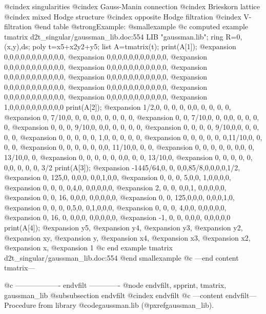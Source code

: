 @cindex singularities
@cindex Gauss-Manin connection
@cindex Brieskorn lattice
@cindex mixed Hodge structure
@cindex opposite Hodge filtration
@cindex V-filtration
@end table
@strong{Example:}
@smallexample
@c computed example tmatrix d2t_singular/gaussman_lib.doc:554 
LIB "gaussman.lib";
ring R=0,(x,y),ds;
poly t=x5+x2y2+y5;
list A=tmatrix(t);
print(A[1]);
@expansion{} 0,0,0,0,0,0,0,0,0,0,0,
@expansion{} 0,0,0,0,0,0,0,0,0,0,0,
@expansion{} 0,0,0,0,0,0,0,0,0,0,0,
@expansion{} 0,0,0,0,0,0,0,0,0,0,0,
@expansion{} 0,0,0,0,0,0,0,0,0,0,0,
@expansion{} 0,0,0,0,0,0,0,0,0,0,0,
@expansion{} 0,0,0,0,0,0,0,0,0,0,0,
@expansion{} 0,0,0,0,0,0,0,0,0,0,0,
@expansion{} 0,0,0,0,0,0,0,0,0,0,0,
@expansion{} 0,0,0,0,0,0,0,0,0,0,0,
@expansion{} 1,0,0,0,0,0,0,0,0,0,0 
print(A[2]);
@expansion{} 1/2,0,   0,   0,   0,   0,0,    0,    0,    0,    0, 
@expansion{} 0,  7/10,0,   0,   0,   0,0,    0,    0,    0,    0, 
@expansion{} 0,  0,   7/10,0,   0,   0,0,    0,    0,    0,    0, 
@expansion{} 0,  0,   0,   9/10,0,   0,0,    0,    0,    0,    0, 
@expansion{} 0,  0,   0,   0,   9/10,0,0,    0,    0,    0,    0, 
@expansion{} 0,  0,   0,   0,   0,   1,0,    0,    0,    0,    0, 
@expansion{} 0,  0,   0,   0,   0,   0,11/10,0,    0,    0,    0, 
@expansion{} 0,  0,   0,   0,   0,   0,0,    11/10,0,    0,    0, 
@expansion{} 0,  0,   0,   0,   0,   0,0,    0,    13/10,0,    0, 
@expansion{} 0,  0,   0,   0,   0,   0,0,    0,    0,    13/10,0, 
@expansion{} 0,  0,   0,   0,   0,   0,0,    0,    0,    0,    3/2
print(A[3]);
@expansion{} -1445/64,0,  0,  0,0,85/8,0,0,0,0,1/2,
@expansion{} 0,       125,0,  0,0,0,   0,0,1,0,0,  
@expansion{} 0,       0,  0,  5,0,0,   1,0,0,0,0,  
@expansion{} 0,       0,  0,  0,4,0,   0,0,0,0,0,  
@expansion{} 2,       0,  0,  0,0,1,   0,0,0,0,0,  
@expansion{} 0,       0,  16, 0,0,0,   0,0,0,0,0,  
@expansion{} 0,       0,  125,0,0,0,   0,0,0,1,0,  
@expansion{} 0,       0,  0,  0,5,0,   0,1,0,0,0,  
@expansion{} 0,       0,  0,  4,0,0,   0,0,0,0,0,  
@expansion{} 0,       16, 0,  0,0,0,   0,0,0,0,0,  
@expansion{} -1,      0,  0,  0,0,0,   0,0,0,0,0   
print(A[4]);
@expansion{} y5,
@expansion{} y4,
@expansion{} y3,
@expansion{} y2,
@expansion{} xy,
@expansion{} y,
@expansion{} x4,
@expansion{} x3,
@expansion{} x2,
@expansion{} x,
@expansion{} 1
@c end example tmatrix d2t_singular/gaussman_lib.doc:554
@end smallexample
@c ---end content tmatrix---

@c ------------------- endvfilt -------------
@node endvfilt, spprint, tmatrix, gaussman_lib
@subsubsection endvfilt
@cindex endvfilt
@c ---content endvfilt---
Procedure from library @code{gaussman.lib} (@pxref{gaussman_lib}).

